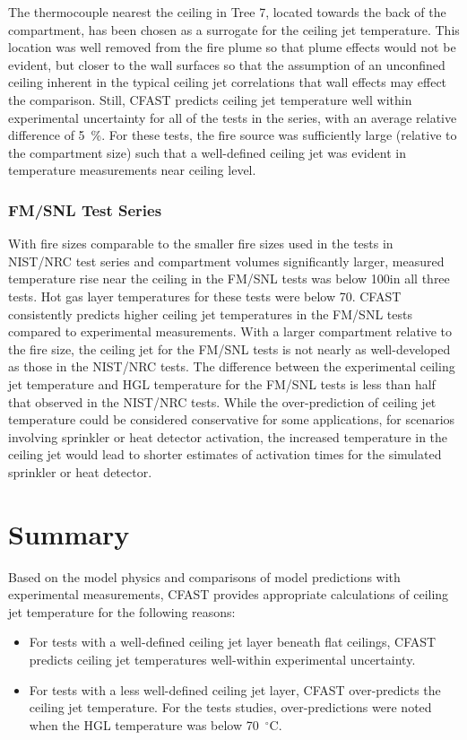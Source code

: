 The thermocouple nearest the ceiling in Tree 7, located towards the back of the compartment, has been chosen as a surrogate for the ceiling jet temperature. This location was well removed from the fire plume so that plume effects would not be evident, but closer to the wall surfaces so that the assumption of an unconfined ceiling inherent in the typical ceiling jet correlations that wall effects may effect the comparison. Still, CFAST predicts ceiling jet temperature well within experimental uncertainty for all of the tests in the series, with an average relative difference of 5~\%.  For these tests, the fire source was sufficiently large (relative to the compartment size) such that a well-defined ceiling jet was evident in temperature measurements near ceiling level.

\subsubsection{FM/SNL Test Series}

With fire sizes comparable to the smaller fire sizes used in the tests in NIST/NRC test series and compartment volumes significantly larger, measured temperature rise near the ceiling in the FM/SNL tests was below 100\degc in all three tests.  Hot gas layer temperatures for these tests were below 70\degc.  CFAST consistently predicts higher ceiling jet temperatures in the FM/SNL tests compared to experimental measurements.  With a larger compartment relative to the fire size, the ceiling jet for the FM/SNL tests is not nearly as well-developed as those in the NIST/NRC tests.  The difference between the experimental ceiling jet temperature and HGL temperature for the FM/SNL tests is less than half that observed in the NIST/NRC tests.  While the over-prediction of ceiling jet temperature could be considered conservative for some applications, for scenarios involving sprinkler or heat detector activation, the increased temperature in the ceiling jet would lead to shorter estimates of activation times for the simulated sprinkler or heat detector.

\section{Summary}

Based on the model physics and comparisons of model predictions with experimental measurements, CFAST provides appropriate calculations of ceiling jet temperature for the following reasons:
\begin{itemize}
\item For tests with a well-defined ceiling jet layer beneath flat ceilings, CFAST predicts ceiling jet temperatures well-within experimental uncertainty.
\item For tests with a less well-defined ceiling jet layer, CFAST over-predicts the ceiling jet temperature.  For the tests studies, over-predictions were noted when the HGL temperature was below 70~$^\circ$C.
\end{itemize}

